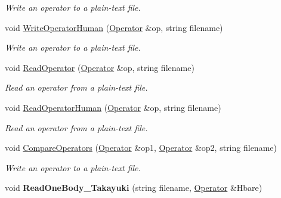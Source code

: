 \begin{DoxyCompactItemize}
\begin{DoxyCompactList}\small\item\em Write an operator to a plain-\/text file. \end{DoxyCompactList}\item 
void \hyperlink{classReadWrite_af9e6ed6e522518f28ebb5d869f571485}{Write\+Operator\+Human} (\hyperlink{classOperator}{Operator} \&op, string filename)\hypertarget{classReadWrite_af9e6ed6e522518f28ebb5d869f571485}{}\label{classReadWrite_af9e6ed6e522518f28ebb5d869f571485}

\begin{DoxyCompactList}\small\item\em Write an operator to a plain-\/text file. \end{DoxyCompactList}\item 
void \hyperlink{classReadWrite_ab924c67864c7af28bcc22a9b87abafb3}{Read\+Operator} (\hyperlink{classOperator}{Operator} \&op, string filename)\hypertarget{classReadWrite_ab924c67864c7af28bcc22a9b87abafb3}{}\label{classReadWrite_ab924c67864c7af28bcc22a9b87abafb3}

\begin{DoxyCompactList}\small\item\em Read an operator from a plain-\/text file. \end{DoxyCompactList}\item 
void \hyperlink{classReadWrite_a31a47d58ac37eb2ded08fe1ae8f585ed}{Read\+Operator\+Human} (\hyperlink{classOperator}{Operator} \&op, string filename)\hypertarget{classReadWrite_a31a47d58ac37eb2ded08fe1ae8f585ed}{}\label{classReadWrite_a31a47d58ac37eb2ded08fe1ae8f585ed}

\begin{DoxyCompactList}\small\item\em Read an operator from a plain-\/text file. \end{DoxyCompactList}\item 
void \hyperlink{classReadWrite_a1275273dc4057c79a8e8c7d96b74f359}{Compare\+Operators} (\hyperlink{classOperator}{Operator} \&op1, \hyperlink{classOperator}{Operator} \&op2, string filename)\hypertarget{classReadWrite_a1275273dc4057c79a8e8c7d96b74f359}{}\label{classReadWrite_a1275273dc4057c79a8e8c7d96b74f359}

\begin{DoxyCompactList}\small\item\em Write an operator to a plain-\/text file. \end{DoxyCompactList}\item 
void {\bfseries Read\+One\+Body\+\_\+\+Takayuki} (string filename, \hyperlink{classOperator}{Operator} \&Hbare)\hypertarget{classReadWrite_a5486b782a5b2e137fea52e28e592c1fa}{}\label{classReadWrite_a5486b782a5b2e137fea52e28e592c1fa}


\end{DoxyCompactItemize}
